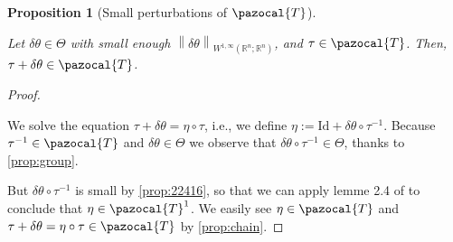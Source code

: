 \documentclass[english,a4paper,9pt,oneside]{scrbook}	%
\theoremstyle{break}
\newtheorem{prop}[equation]{Proposition}
\newenvironment{mproof}[1][\proofname]{%
  \begin{proof}[#1]$ $\par\nobreak\ignorespaces
}{%
  \end{proof}
}
\renewcommand*{\proofname}{Proof}
\theoremstyle{remark}
\newcommand{\mR}{\mathbb{R}}
\newcommand{\norm}[1]{\left\lVert#1\right\rVert}
\newcommand{\cT}{\pazocal{T}}
\newcommand{\id}{\text{Id}}
\newcommand{\te}{\theta}
\newcommand{\Te}{\Theta}
\begin{document}
\begin{appendices}
\begin{prop}[Small perturbations of $\cT$]
\label{prop:ptb_id}

Let $\delta \te \in \Te$ with small enough $\norm{\delta\te}_{W^{1,\infty}(\mR^n;\mR^n)}$, and $\tau \in \cT$. Then, $\tau + \delta \te\in \cT$.

\end{prop}
\begin{mproof}

%
%

%
%


We solve the equation $\tau + \delta \te =\eta \circ \tau$, i.e., we define $\eta:=\id + \delta \te \circ \tau^{-1}$. Because $\tau^{-1} \in \cT$ and $\delta \te \in \Te$ we observe that $\delta \te \circ \tau^{-1} \in \Te $, thanks to \cref{prop:group}.

But $\delta \te \circ \tau^{-1}$ is small by \cref{prop:22416}, so that we can apply lemme 2.4 of \cite{murat} to conclude that $\eta \in \cT^1$. We easily see $\eta \in \cT$ and $\tau + \delta \te = \eta \circ \tau \in \cT$ by \cref{prop:chain}.
\end{mproof}


\end{appendices}
\end{document}

